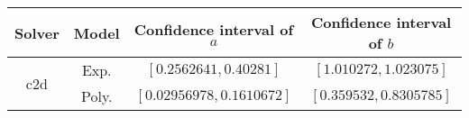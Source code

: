 \begin{tabular}{cc|cc} 
\hline 
Solver  & Model  & Confidence interval of $a$  & Confidence interval of $b$ \tabularnewline 
\hline 
\hline 
\multirow{2}{*}{c2d} & Exp. & $\left[0.2562641,0.40281\right]$ & $\left[1.010272,1.023075\right]$ \tabularnewline 
 & Poly. & $\left[0.02956978,0.1610672\right]$ & $\left[0.359532,0.8305785\right]$ \tabularnewline 
\hline 
\end{tabular} 

